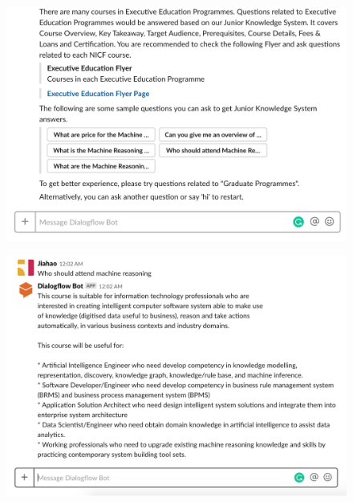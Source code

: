 		\begin{figure}[H]
			\centering
			\includegraphics[width=\linewidth, frame]{img/scenario_2_2.png}
		\end{figure}

		\begin{figure}[H]
			\centering
			\includegraphics[width=\linewidth, frame]{img/scenario_2_3.png}
		\end{figure}

